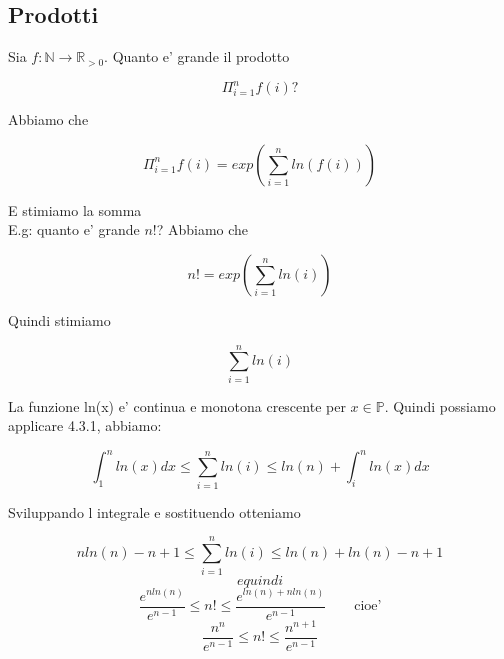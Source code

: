 \documentclass{article}
\begin{document}
        \subsection{Prodotti}
        \begin{flushleft}
          Sia $f: \mathbb{N} \to \mathbb{R}_{>0}$. Quanto e' grande il prodotto
        \end{flushleft}
        \begin{equation*}
          \Pi^n_{i=1} f(i)?
        \end{equation*}
        \begin{flushleft}
          Abbiamo che 
        \end{flushleft}
        \begin{equation*}
          \Pi^n_{i=1} f(i)=exp(\sum^n_{i=1} ln(f(i)))
        \end{equation*}
        \begin{flushleft}
          E stimiamo la somma \\ 
          E.g: quanto e' grande $n!$? Abbiamo che
        \end{flushleft}
        \begin{equation*}
          n!=exp(\sum^n_{i=1} ln(i))
        \end{equation*}
        \begin{flushleft}
          Quindi stimiamo
        \end{flushleft}
        \begin{equation*}
          \sum^n_{i=1} ln(i)
        \end{equation*}
        \begin{flushleft}
          La funzione ln(x) e' continua e monotona crescente per $x \in \mathbb{P}$. Quindi possiamo applicare 4.3.1, abbiamo:
        \end{flushleft}
        \begin{equation*}
          \int^n_1 ln(x)dx \leq \sum^n_{i=1} ln(i) \leq ln(n)+\int^n_i ln(x)dx
        \end{equation*}
        \begin{flushleft}
          Sviluppando l integrale e sostituendo otteniamo
        \end{flushleft}
        \begin{equation*}
          nln(n)-n+1 \leq \sum^n_{i=1} ln(i) \leq ln(n) +ln(n)-n+1
        \end{equation*}
        \begin{equation*}
          e quindi
        \end{equation*}
        \begin{equation*}
          \frac{e^{nln(n)}}{e^{n-1}} \leq n! \leq \frac{e^{ln(n)+nln(n)}}{e^{n-1}} \quad \quad \text{cioe'}
        \end{equation*}
        \begin{equation*}
          \frac{n^n}{e^{n-1}}\leq n! \leq \frac{n^{n+1}}{e^{n-1}}
        \end{equation*}
\end{document}
